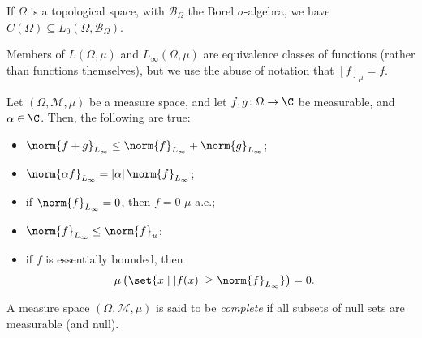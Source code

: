 \begin{fact}
  If $\Omega$ is a topological space, with $\mathcal{B}_{\Omega}$ the Borel $\sigma$-algebra, we have $C\left(\Omega\right)\subseteq L_{0}\left(\Omega,\mathcal{B}_{\Omega}\right)$.\newline
\end{fact}
\begin{remark}
  Members of $L\left(\Omega,\mu\right)$ and $L_{\infty}\left(\Omega,\mu\right)$ are equivalence classes of functions (rather than functions themselves), but we use the abuse of notation that $\left[f\right]_{\mu} = f$.
\end{remark}

\begin{fact}
  Let $\left(\Omega,\mathcal{M},\mu\right)$ be a measure space, and let $f,g\colon \Omega\rightarrow \C$ be measurable, and $\alpha \in \C$. Then, the following are true:
  \begin{itemize}
    \item $\displaystyle \norm{f+g}_{L_\infty}\leq \norm{f}_{L_\infty} + \norm{g}_{L_\infty}$;
    \item $\displaystyle \norm{\alpha f}_{L_\infty} = \left\vert \alpha \right\vert\norm{f}_{L_\infty}$;
    \item if $\displaystyle \norm{f}_{L_\infty} = 0$, then $f = 0$ $\mu$-a.e.;
    \item $\displaystyle \norm{f}_{L_\infty}\leq \norm{f}_{u}$;
    \item if $f$ is essentially bounded, then
      \begin{align*}
        \mu\left(\set{x\mid \left\vert f(x) \right\vert\geq \norm{f}_{L_\infty}}\right) &= 0.
      \end{align*}
  \end{itemize}
\end{fact}

\begin{definition}
A measure space $\left(\Omega,\mathcal{M},\mu\right)$ is said to be \textit{complete} if all subsets of null sets are measurable (and null).
\end{definition}
